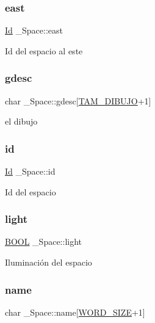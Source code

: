 \subsubsection{\texorpdfstring{east}{east}}
{\footnotesize\ttfamily \hyperlink{types_8h_a845e604fb28f7e3d97549da3448149d3}{Id} \+\_\+\+Space\+::east}

Id del espacio al este \mbox{\label{struct__Space_af311939768f2208925e07a50ebd3f045}} 
\subsubsection{\texorpdfstring{gdesc}{gdesc}}
{\footnotesize\ttfamily char \+\_\+\+Space\+::gdesc\mbox{[}\hyperlink{space_8h_a894ebc9b2098fe63607e0ca2e5f5ce8d}{T\+A\+M\+\_\+\+D\+I\+B\+U\+JO}+1\mbox{]}}

el dibujo \mbox{\label{struct__Space_a70cb461deb9ac073e401b607339b567f}} 
\subsubsection{\texorpdfstring{id}{id}}
{\footnotesize\ttfamily \hyperlink{types_8h_a845e604fb28f7e3d97549da3448149d3}{Id} \+\_\+\+Space\+::id}

Id del espacio \mbox{\label{struct__Space_a15f20d8ccdec846b9a4f77464748bff5}} 
\subsubsection{\texorpdfstring{light}{light}}
{\footnotesize\ttfamily \hyperlink{types_8h_a3e5b8192e7d9ffaf3542f1210aec18dd}{B\+O\+OL} \+\_\+\+Space\+::light}

Iluminación del espacio \mbox{\label{struct__Space_aa1c9c994c2d16ecf3ef46138685fdfdc}} 
\subsubsection{\texorpdfstring{name}{name}}
{\footnotesize\ttfamily char \+\_\+\+Space\+::name\mbox{[}\hyperlink{types_8h_a92ed8507d1cd2331ad09275c5c4c1c89}{W\+O\+R\+D\+\_\+\+S\+I\+ZE}+1\mbox{]}}

